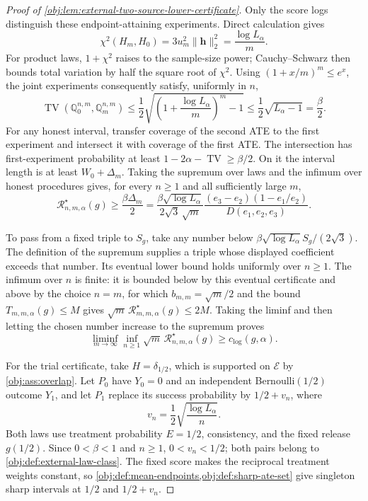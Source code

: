 \begin{proof}[Proof of \cref{obj:lem:external-two-source-lower-certificate}]
Only the score logs distinguish these endpoint-attaining experiments. Direct calculation gives
\[
\chi^2(H_m,H_0)
=3u_m^2\|\mathbf h\|_2^2
=\frac{\log L_\alpha}{m}.
\]
For product laws, \(1+\chi^2\) raises to the sample-size power; Cauchy--Schwarz then bounds total variation by half the square root of \(\chi^2\). Using \((1+x/m)^m\le e^x\), the joint experiments consequently satisfy, uniformly in \(n\),
\[
\operatorname{TV}(\mathbb Q_0^{n,m},\mathbb Q_m^{n,m})
\le\frac12
 \sqrt{\left(1+\frac{\log L_\alpha}{m}\right)^m-1}
\le\frac12\sqrt{L_\alpha-1}
=\frac{\beta}{2}.
\]
For any honest interval, transfer coverage of the second ATE to the first experiment and intersect it with coverage of the first ATE. The intersection has first-experiment probability at least
\(1-2\alpha-\operatorname{TV}\ge\beta/2\). On it the interval length is at least \(W_0+\Delta_m\). Taking the supremum over laws and the infimum over honest procedures gives, for every \(n\ge1\) and all sufficiently large \(m\),
\[
\mathcal R^\star_{n,m,\alpha}(g)
\ge\frac{\beta\Delta_m}{2}
=\frac{\beta\sqrt{\log L_\alpha}}{2\sqrt3\,\sqrt m}
  \frac{(e_3-e_2)(1-e_1/e_2)}
       {D(e_1,e_2,e_3)}.
\]

To pass from a fixed triple to \(S_g\), take any number below
\(\beta\sqrt{\log L_\alpha}S_g/(2\sqrt3)\). The definition of the supremum supplies a triple whose displayed coefficient exceeds that number. Its eventual lower bound holds uniformly over \(n\ge1\). The infimum over \(n\) is finite: it is bounded below by this eventual certificate and above by the choice \(n=m\), for which \(b_{m,m}=\sqrt m/2\) and the bound \(T_{m,m,\alpha}(g)\le M\) gives
\(\sqrt m\,\mathcal R^\star_{m,m,\alpha}(g)\le2M\). Taking the liminf and then letting the chosen number increase to the supremum proves
\[
\liminf_{m\to\infty}\inf_{n\ge1}
 \sqrt m\,\mathcal R^\star_{n,m,\alpha}(g)
\ge c_{\mathrm{log}}(g,\alpha).
\]

For the trial certificate, take \(H=\delta_{1/2}\), which is supported on \(\mathcal E\) by \cref{obj:ass:overlap}. Let \(P_0\) have \(Y_0=0\) and an independent Bernoulli\((1/2)\) outcome \(Y_1\), and let \(P_1\) replace its success probability by \(1/2+v_n\), where
\[
v_n=\frac12\sqrt{\frac{\log L_\alpha}{n}}.
\]
Both laws use treatment probability \(E=1/2\), consistency, and the fixed release \(g(1/2)\). Since \(0<\beta<1\) and \(n\ge1\), \(0<v_n<1/2\); both pairs belong to \cref{obj:def:external-law-class}. The fixed score makes the reciprocal treatment weights constant, so \cref{obj:def:mean-endpoints,obj:def:sharp-ate-set} give singleton sharp intervals at \(1/2\) and \(1/2+v_n\).


\end{proof}
